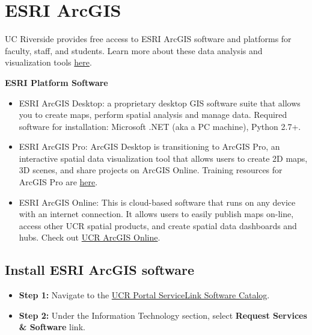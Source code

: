\documentclass[
]{book}
\providecommand{\tightlist}{%
  \setlength{\itemsep}{0pt}\setlength{\parskip}{0pt}}
\begin{document}
\hypertarget{esri-arcgis}{%
\section{ESRI ArcGIS}\label{esri-arcgis}}

UC Riverside provides free access to ESRI ArcGIS software and platforms for faculty, staff, and students. Learn more about these data analysis and visualization tools \href{https://ucrsupport.service-now.com/ucr_portal?id=sc_category\&sys_id=e9b36a7e1b691c10eab58734ec4bcb78\&catalog_id=-1}{here}.

\textbf{ESRI Platform Software}

\begin{itemize}
\tightlist
\item
  ESRI ArcGIS Desktop: a proprietary desktop GIS software suite that allows you to create maps, perform spatial analysis and manage data. Required software for installation: Microsoft .NET (aka a PC machine), Python 2.7+.
\item
  ESRI ArcGIS Pro: ArcGIS Desktop is transitioning to ArcGIS Pro, an interactive spatial data visualization tool that allows users to create 2D maps, 3D scenes, and share projects on ArcGIS Online. Training resources for ArcGIS Pro are \href{https://www.esri.com/en-us/arcgis/products/arcgis-pro/resources}{here}.
\item
  ESRI ArcGIS Online: This is cloud-based software that runs on any device with an internet connection. It allows users to easily publish maps on-line, access other UCR spatial products, and create spatial data dashboards and hubs. Check out \href{https://ucr.maps.arcgis.com/home/index.html}{UCR ArcGIS Online}.
\end{itemize}

\hypertarget{install-esri-arcgis-software}{%
\subsection{Install ESRI ArcGIS software}\label{install-esri-arcgis-software}}

\begin{itemize}
\item
  \textbf{Step 1:} Navigate to the \href{https://ucrsupport.service-now.com/ucr_portal}{UCR Portal ServiceLink Software Catalog}.
\item
  \textbf{Step 2:} Under the Information Technology section, select \textbf{Request Services \& Software} link.
\end{itemize}
\end{document}
